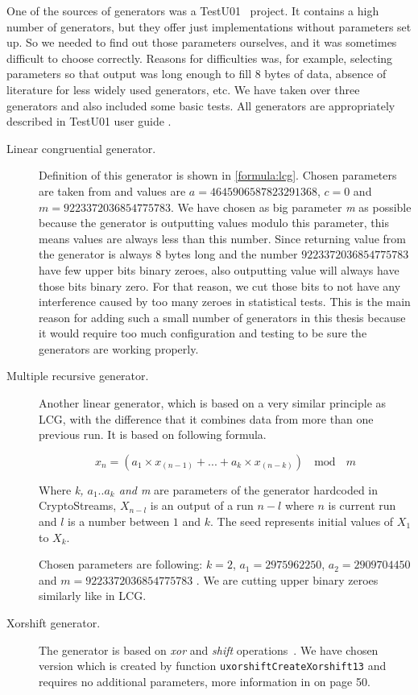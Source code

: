 \documentclass[
    digital,    %
    oneside,    %
    color,
    11pt,
    nocover,
    notable,
    nolof,
    nolot,
    final
]{fithesis3}
\renewcommand\_{\textunderscore\allowbreak}
\begin{document}
One of the sources of generators was a TestU01~\cite{l2007testu01} project. It contains a high number of generators, but they offer just implementations without parameters set up. So we needed to find out those parameters ourselves, and it was sometimes difficult to choose correctly. Reasons for difficulties was, for example, selecting parameters so that output was long enough to fill 8 bytes of data, absence of literature for less widely used generators, etc. We have taken over three generators and also included some basic tests. All generators are appropriately described in TestU01 user guide \cite{LEcuyer07testu01}.
\begin{description}
	\item[Linear congruential generator.] Definition of this generator is shown in \cref{formula:lcg}. Chosen parameters are taken from \cite{L-Ecuyer:LCG} and values are $a = 4645906587823291368$, $c = 0$ and $m = 9223372036854775783$. We have chosen as big parameter \textit{m} as possible because the generator is outputting values modulo this parameter, this means values are always less than this number. Since returning value from the generator is always 8 bytes long and the number $ 9223372036854775783 $ have few upper bits binary zeroes, also outputting value will always have those bits binary zero. For that reason, we cut those bits to not have any interference caused by too many zeroes in statistical tests. This is the main reason for adding such a small number of generators in this thesis because it would require too much configuration and testing to be sure the generators are working properly.
	
	\item[Multiple recursive generator.] Another linear generator, which is based on a very similar principle as LCG, with the difference that it combines data from more than one previous run. It is based on following formula.
	
	\begin{equation}
	x_{n} = \left(a_{1} \times x_{\left(n-1\right)} + . . . + a_{k} \times x_{\left(n-k\right)}\right)~~\bmod~~m
	\end{equation}
	
	Where \textit{k, $a_{1} .. a_{k}$ and m} are parameters of the generator hardcoded in CryptoStreams, $X_{n-l}$ is an output of a run $n-l$ where $n$ is current run and $l$ is a number between $1$ and $k$. The seed represents initial values of $X_{1}$ to $X_{k}$.
	
	 Chosen parameters are following: $ k = 2 $, $ a_{1} = 2975962250 $, $ a_{2} = 2909704450 $ and $ m = 9223372036854775783 $ \cite{L_Ecuyer:MRG}. We are cutting upper binary zeroes similarly like in LCG.
	
	\item[Xorshift generator.] The generator is based on \textit{xor} and \textit{shift} operations~\cite{RePEc:jss:jstsof:v:008:i14}. We have chosen version which is created by function \texttt{uxorshift\_CreateXorshift13} and requires no additional parameters, more information in \cite{LEcuyer07testu01} on page 50. \\
\end{description}
\end{document}
